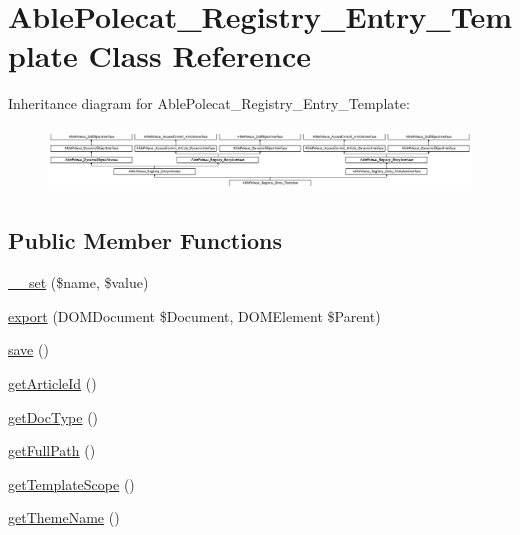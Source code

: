 \hypertarget{class_able_polecat___registry___entry___template}{}\section{Able\+Polecat\+\_\+\+Registry\+\_\+\+Entry\+\_\+\+Template Class Reference}
\label{class_able_polecat___registry___entry___template}
Inheritance diagram for Able\+Polecat\+\_\+\+Registry\+\_\+\+Entry\+\_\+\+Template\+:\begin{figure}[H]
\begin{center}
\leavevmode
\includegraphics[height=1.707317cm]{class_able_polecat___registry___entry___template}
\end{center}
\end{figure}
\subsection*{Public Member Functions}
\begin{DoxyCompactItemize}
\item 
\hyperlink{class_able_polecat___registry___entry___template_a83c2703c91959192f759992ad5640b67}{\+\_\+\+\_\+set} (\$name, \$value)
\item 
\hyperlink{class_able_polecat___registry___entry___template_a0a05b2e4b3a44390eeb042064e427b1a}{export} (D\+O\+M\+Document \$Document, D\+O\+M\+Element \$Parent)
\item 
\hyperlink{class_able_polecat___registry___entry___template_afc8a3c62679cf00ade9f15fb2a6d6132}{save} ()
\item 
\hyperlink{class_able_polecat___registry___entry___template_a169d60493254e284dc1c60ffe9253ed4}{get\+Article\+Id} ()
\item 
\hyperlink{class_able_polecat___registry___entry___template_a039f3de296e2836b8e47ed4382baa473}{get\+Doc\+Type} ()
\item 
\hyperlink{class_able_polecat___registry___entry___template_ac151a54c6136d7dee6bbe8d0e744bd32}{get\+Full\+Path} ()
\item 
\hyperlink{class_able_polecat___registry___entry___template_a1107269713ebd12a0dc5bcd12a16f8f0}{get\+Template\+Scope} ()
\item 
\hyperlink{class_able_polecat___registry___entry___template_aa146c4c73f2e0eabc0630e1a4464a774}{get\+Theme\+Name} ()
\end{DoxyCompactItemize}
